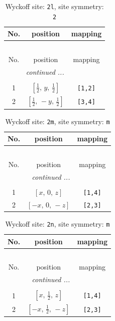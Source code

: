 \documentclass[fleqn,8pt]{jsarticle}
\begin{document}
\begin{longtable}{ccc}
\caption{Wyckoff site: {\tt 2l}, site symmetry: {\tt 2}}
 \\
 \hline \hline
No. & position & mapping \\ \hline \endfirsthead

\multicolumn{2}{l}{\tablename\ \thetable{}} \\
 \hline \hline
No. & position & mapping \\ \hline \endhead

 \hline \hline
\multicolumn{2}{r}{\footnotesize\it continued ...} \\ \endfoot

 \hline \hline
\multicolumn{2}{r}{} \\ \endlastfoot

1 & $\left[ \frac{1}{2},\, y,\, \frac{1}{2} \right]$ & {\tt [1,2]} \\ \hline
2 & $\left[ \frac{1}{2},\, - y,\, \frac{1}{2} \right]$ & {\tt [3,4]} \\
\end{longtable}
\renewcommand{\arraystretch}{1.2}
\begin{longtable}{ccc}
\caption{Wyckoff site: {\tt 2m}, site symmetry: {\tt m}}
 \\
 \hline \hline
No. & position & mapping \\ \hline \endfirsthead

\multicolumn{2}{l}{\tablename\ \thetable{}} \\
 \hline \hline
No. & position & mapping \\ \hline \endhead

 \hline \hline
\multicolumn{2}{r}{\footnotesize\it continued ...} \\ \endfoot

 \hline \hline
\multicolumn{2}{r}{} \\ \endlastfoot

1 & $\left[ x,\, 0,\, z \right]$ & {\tt [1,4]} \\ \hline
2 & $\left[ - x,\, 0,\, - z \right]$ & {\tt [2,3]} \\
\end{longtable}
\renewcommand{\arraystretch}{1.2}
\begin{longtable}{ccc}
\caption{Wyckoff site: {\tt 2n}, site symmetry: {\tt m}}
 \\
 \hline \hline
No. & position & mapping \\ \hline \endfirsthead

\multicolumn{2}{l}{\tablename\ \thetable{}} \\
 \hline \hline
No. & position & mapping \\ \hline \endhead

 \hline \hline
\multicolumn{2}{r}{\footnotesize\it continued ...} \\ \endfoot

 \hline \hline
\multicolumn{2}{r}{} \\ \endlastfoot

1 & $\left[ x,\, \frac{1}{2},\, z \right]$ & {\tt [1,4]} \\ \hline
2 & $\left[ - x,\, \frac{1}{2},\, - z \right]$ & {\tt [2,3]} \\
\end{longtable}
\end{document}
